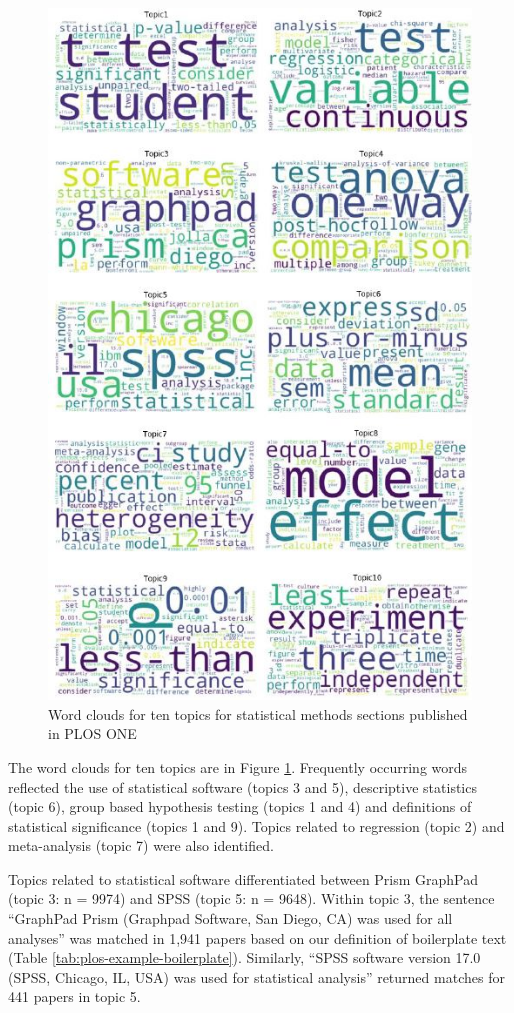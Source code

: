 \documentclass[12pt]{article}
\begin{document}
\begin{figure}

{\centering \includegraphics[width=0.8\linewidth]{figures/ploswordclouds} 

}

\caption{\label{fig:plos-clouds}Word clouds for ten topics for statistical methods sections published in PLOS ONE}\label{fig:plos-clouds}
\end{figure}

The word clouds for ten topics are in Figure \ref{fig:plos-clouds}.
Frequently occurring words reflected the use of statistical software
(topics 3 and 5), descriptive statistics (topic 6), group based
hypothesis testing (topics 1 and 4) and definitions of statistical
significance (topics 1 and 9). Topics related to
regression (topic 2) and meta-analysis (topic 7) were also identified.

Topics related to statistical software differentiated between Prism
GraphPad (topic 3: n = 9974) and SPSS (topic 5: n = 9648).
Within topic 3, the sentence ``GraphPad Prism (Graphpad Software, San
Diego, CA) was used for all analyses'' was matched in 1,941 papers based on our definition of boilerplate text (Table \ref{tab:plos-example-boilerplate}).
Similarly, ``SPSS software version
17.0 (SPSS, Chicago, IL, USA) was used for statistical analysis'' returned matches for 441 papers in topic 5.
\end{document}
